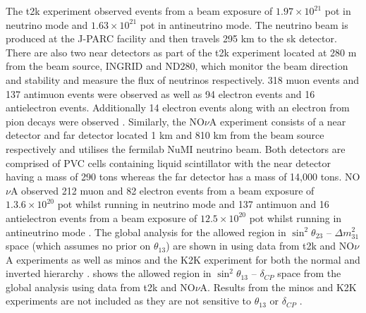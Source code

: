 The \gls{t2k} experiment observed events from a beam exposure of $1.97 \times 10^{21}$ \gls{pot} in neutrino mode and $1.63 \times 10^{21}$ \gls{pot} in antineutrino mode. The neutrino beam is produced at the J-PARC facility and then travels 295 km to the \gls{sk} detector. There are also two near detectors as part of the \gls{t2k} experiment located at 280 m from the beam source, INGRID and ND280, which monitor the beam direction and stability and measure the flux of neutrinos respectively. 318 muon events and 137 antimuon events were observed as well as 94 electron events and 16 antielectron events. Additionally 14 electron events along with an electron from pion decays were observed \cite{T2K_2020}. Similarly, the NO$\nu$A experiment consists of a near detector and far detector located 1 km and 810 km from the beam source respectively and utilises the \gls{fermilab} NuMI neutrino beam. Both detectors are comprised of PVC cells containing liquid scintillator with the near detector having a mass of 290 tons whereas the far detector has a mass of 14,000 tons. NO$\nu$A observed 212 muon and 82 electron events from a beam exposure of $1.3.6 \times 10^{20}$ \gls{pot} whilst running in neutrino mode and 137 antimuon and 16 antielectron events from a beam exposure of $12.5 \times 10^{20}$ \gls{pot} whilst running in antineutrino mode \cite{New_constraints_on_oscillation_parameters_from_nue_and_numu_disappearance_in_the_NOvA_experiment}\cite{First_measurement_of_neutrino_oscillation_parameters_using_neutrinos_and_antineutrinos_by_NOvA}. The global analysis for the allowed region in $\sin^2{\theta_{23}}$ -- $\Delta m^2_{31}$ space (which assumes no prior on $\theta_{13}$) are shown in  using data from \gls{t2k} and NO$\nu$A experiments as well as \gls{minos} and the K2K experiment for both the normal and inverted hierarchy  \cite{Measurement_of_Neutrino_and_Antineutrino_Oscillations_Using_Beam_and_Atmospheric_Data_in_MINOS}\cite{Electron_Neutrino_and_Antineutrino_Appearance_in_the_Full_MINOS_Data_Sample}\cite{K2K_experiment}.  shows the allowed region in $\sin^2{\theta_{13}}$ -- $\delta_{CP}$ space from the global analysis using data from \gls{t2k} and NO$\nu$A. Results from the \gls{minos} and K2K experiments are not included as they are not sensitive to $\theta_{13}$ or $\delta_{CP}$ \cite{2020_global_reassessment_of_the_neutrino_oscillation_picture}. 

